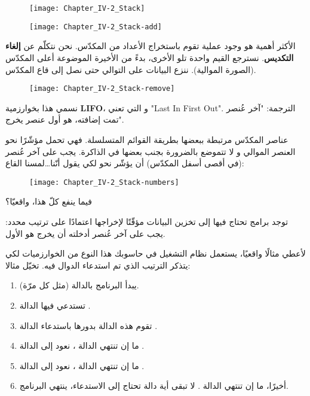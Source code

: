 \begin{figure}[H]
	\centering
	\texttt{[image: Chapter\_IV-2\_Stack]}
\end{figure}
\begin{figure}[H]
	\centering
	\texttt{[image: Chapter\_IV-2\_Stack-add]}
\end{figure}

الأكثر أهمية هو وجود عملية تقوم باستخراج الأعداد من المكدّس. نحن نتكلّم عن
\textbf{إلغاء التكديس}.
نسترجع القيم واحدة تلو الأخرى، بدءً من الأخيرة الموضوعة أعلى المكدّس (الصورة الموالية). ننزع البيانات على التوالي حتى نصل إلى قاع المكدّس.

\begin{figure}[H]
	\centering
	\texttt{[image: Chapter\_IV-2\_Stack-remove]}
\end{figure}

نسمي هذا بخوارزمية
\textbf{\textenglish{LIFO}}،
و التي تعني
"\textenglish{Last In First Out}".
الترجمة: "آخر عُنصر تمت إضافته، هو أول عنصر يخرج".

عناصر المكدّس مرتبطة ببعضها بطريقة القوائم المتسلسلة. فهي تحمل مؤشّرًا نحو العنصر الموالي و لا تتموضع بالضرورة بجنب بعضها في الذاكرة. يجب على آخر عُنصر (في أقصى أسفل المكدّس) أن يؤشّر نحو
لكي يقول أنّنا\dots لمسنا القاع:

\begin{figure}[H]
	\centering
	\texttt{[image: Chapter\_IV-2\_Stack-numbers]}
\end{figure}

\begin{question}
 فيما ينفع كلّ هذا، واقعيّا؟
\end{question}

توجد برامج تحتاج فيها إلى تخزين البيانات مؤقّتًا لإخراجها اعتمادًا على ترتيب محدد: يجب على آخر عُنصر أدخلته أن يخرج هو الأول.

لأعطي مثالًا واقعيًا، يستعمل نظام التشغيل في حاسوبك هذا النوع من الخوارزميات لكي يتذكر الترتيب الذي تم استدعاء الدوال فيه. تخيّل مثالا:

\begin{enumerate}
	\item يبدأ البرنامج بالدالة
	(مثل كل مرّة).
	\item تستدعي فيها الدالة 
	.
	\item تقوم هذه الدالة 
	بدورها باستدعاء الدالة
	.
	\item ما إن تنتهي الدالة
	،
	نعود إلى الدالة
	.
	\item ما إن تنتهي الدالة 
	،
	نعود إلى الدالة 
	.
	\item أخيرًا، ما إن تنتهي الدالة
	.
	لا تبقى أية دالة تحتاج إلى الاستدعاء، ينتهي البرنامج.
\end{enumerate}


